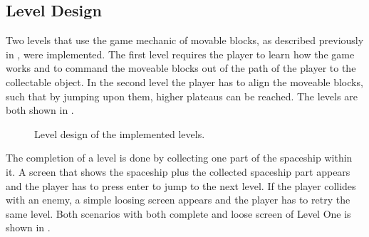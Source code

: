 \subsection{Level Design}\label{sec:game_design_level}
Two levels that use the game mechanic of movable blocks, as described previously in , were implemented.
The first level requires the player to learn how the game works and to command the moveable blocks out of the path of the player to the collectable object.
In the second level the player has to align the moveable blocks, such that by jumping upon them, higher plateaus can be reached.
The levels are both shown in .
\begin{figure}[!ht]
  \centering
  \qquad
  \caption{Level design of the implemented levels.}
  \label{fig:game_design_level}
\end{figure}
\FloatBarrier
\noindent
The completion of a level is done by collecting one part of the spaceship within it.
A screen that shows the spaceship plus the collected spaceship part appears and the player has to press enter to jump to the next level.
If the player collides with an enemy, a simple loosing screen appears and the player has to retry the same level.
Both scenarios with both complete and loose screen of Level One is shown in .
